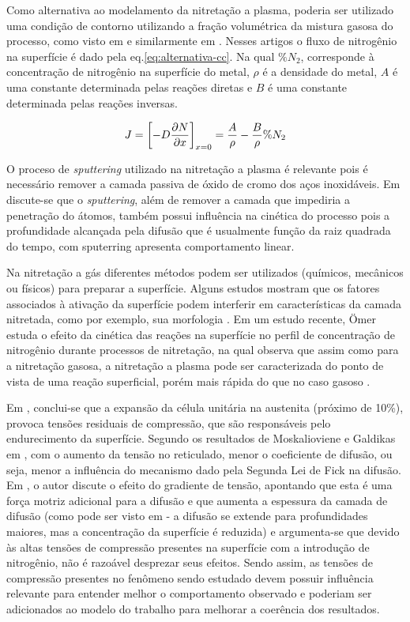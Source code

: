 Como alternativa ao modelamento da nitretação a plasma, poderia ser utilizado uma condição de contorno utilizando a fração volumétrica da mistura gasosa do processo, como visto em \cite{garzon2006modelamento} e similarmente em \cite{franco2003numerical}. Nesses artigos o fluxo de nitrogênio na superfície é dado pela eq.\ref{eq:alternativa-cc}. Na qual $\%N_2$, corresponde à concentração de nitrogênio na superfície do metal, $\rho$ é a densidade do metal, $A$ é uma constante determinada pelas reações diretas e $B$ é uma constante determinada pelas reações inversas.

\begin{equation} \label{eq:alternativa-cc}
 J = \left[-D\pdv{N}{x}\right]_{x=0} = \dfrac{A}{\rho} - \dfrac{B}{\rho} \%N_2 
\end{equation}

O proceso de \textit{sputtering} utilizado na nitretação a plasma é relevante pois é necessário remover a camada passiva de óxido de cromo dos aços inoxidáveis. Em \cite{moller2001surface} discute-se que o \textit{sputtering}, além de remover a camada que impediria a penetração do átomos, também possui influência na cinética do processo pois a profundidade alcançada pela difusão que é usualmente função da raiz quadrada do tempo, com sputerring apresenta comportamento linear.

Na nitretação a gás diferentes métodos podem ser utilizados (químicos, mecânicos ou físicos) para preparar a superfície. Alguns estudos mostram que os fatores associados à ativação da superfície podem interferir em características da camada nitretada, como por exemplo, sua morfologia \cite{baranowska2010importance}. Em um estudo recente, Ömer estuda o efeito da cinética das reações na superfície no perfil de concentração de nitrogênio durante processos de nitretação, na qual observa que assim como para a nitretação gasosa, a nitretação a plasma pode ser caracterizada do ponto de vista de uma reação superficial, porém mais rápida do que no caso gasoso \cite{kucukyildiz2019thermo}.


Em \cite{tschiptschin2010estrutura}, conclui-se que a expansão da célula unitária na austenita (próximo de 10\%), provoca tensões residuais de compressão, que são responsáveis pelo endurecimento da superfície. Segundo os resultados de  Moskalioviene e Galdikas em \cite{moskalioviene2011stress}, com o aumento da tensão no reticulado, menor o coeficiente de difusão, ou seja, menor a influência do mecanismo dado pela Segunda Lei de Fick na difusão. 
Em \cite{kucukyildiz2019thermo}, o autor discute o efeito do gradiente de tensão, apontando que esta é uma força motriz adicional para a difusão e que aumenta a espessura da camada de difusão (como pode ser visto em \cite{li2017effect} - a difusão se extende para profundidades maiores, mas a concentração da superfície é reduzida) e argumenta-se que devido às altas tensões de compressão presentes na superfície com a introdução de nitrogênio, não é razoável desprezar seus efeitos. Sendo assim, as tensões de compressão presentes no fenômeno sendo estudado devem possuir influência relevante para entender melhor o comportamento observado e poderiam ser adicionados ao modelo do trabalho para melhorar a coerência dos resultados.

